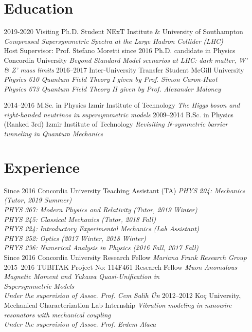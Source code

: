 \documentclass[]{friggeri-cv}
\begin{document}
\section{Education}
\begin{entrylist}
	   \entry
	{2019-2020}
	{Visiting Ph.D. Student}
	{NExT Institute \& University of Southampton}
	{\emph{Compressed Supersymmetric Spectra at the Large Hadron Collider (LHC)} \\
		Host Supervisor: Prof. Stefano Moretti}
  \entry
    {since 2016}
    {Ph.D. candidate in Physics}
    {Concordia University}
    {\emph{Beyond Standard Model scenarios at LHC: dark matter, W' \& Z' mass limits}}
   \entry
   {2016--2017}
   {Inter-University Transfer Student}
   {McGill University}
   {\emph{Physics 610 Quantum Field Theory I given by Prof. Simon Caron-Huot \\
      Physics 673 Quantum Field Theory II given by Prof. Alexander Maloney }}
   
  \entry
    {2014–2016}
    {M.Sc. in Physics}
    {Izmir Institute of Technology}
    {\emph{The Higgs boson and right-handed neutrinos in supersymmetric models}}
  \entry
    {2009–2014}
    {B.Sc. in Physics (Ranked 3rd)}
    {Izmir Institute of Technology}
    {\emph{Revisiting N-symmetric barrier tunneling in Quantum Mechanics}}
    

\end{entrylist}

\section{Experience}

\begin{entrylist}
  \entry
    {Since 2016}
    {Concordia University}
    {Teaching Assistant (TA)}
    {\emph{
    PHYS 204: Mechanics (Tutor, 2019 Summer) \\    		
    PHYS 367: Modern Physics and Relativity (Tutor, 2019 Winter) \\		
    PHYS 245: Classical Mechanics (Tutor, 2018 Fall) \\
	PHYS 224: Introductory Experimental Mechanics (Lab Assistant) \\    		
    PHYS 252: Optics (2017 Winter, 2018 Winter) \\ 
	PHYS 236: Numerical Analysis in Physics (2016 Fall, 2017 Fall) \\
	}}
  \entry
    {Since 2016}
    {Concordia University}
    {Research Fellow}
    {\emph{Mariana Frank Research Group}}
  \entry
    {2015--2016}
    {TUBITAK Project No: 114F461}
    {Research Fellow}
    {\emph{Muon Anomalous Magnetic Moment and Yukawa Quasi-Unification in \\ Supersymmetric Models \\
    		Under the supervision of Assoc. Prof. Cem Salih Ün}}  
  \entry
  	{2012--2012}
  	{Koç University, Mechanical Characterization Lab}
  	{Internship}
  	{\emph{Vibration modeling in nanowire resonators with mechanical coupling \\
  	 Under the supervision of Assoc. Prof. Erdem Alaca}}  
\end{entrylist}
\end{document}
